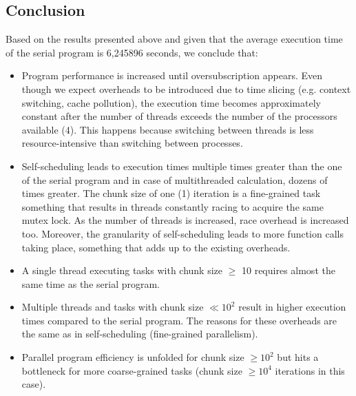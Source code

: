 \documentclass{article}
\begin{document}
\pagebreak

\subsection{Conclusion}
Based on the results presented above and given that the average execution time of the serial
program is 6,245896 seconds, we conclude that:

\begin{itemize}
 \item Program performance is increased until oversubscription appears. Even though we expect
       overheads to be introduced due to time slicing (e.g. context switching, cache pollution),
       the execution time becomes approximately constant after the number of threads exceeds
       the number of the processors available (4). This happens because switching between
       threads is less resource-intensive than switching between processes.
 \item Self-scheduling leads to execution times multiple times greater than the one of the
       serial program and in case of multithreaded calculation, dozens of times greater.
       The chunk size of one (1) iteration is a fine-grained task something that results
       in threads constantly racing to acquire the same mutex lock. As the number of threads
       is increased, race overhead is increased too. Moreover, the granularity of self-scheduling
       leads to more function calls taking place, something that adds up to the existing overheads.
 \item A single thread executing tasks with chunk size $\geq$ 10 requires almost the same time
       as the serial program.
 \item Multiple threads and tasks with chunk size $\ll 10^2$ result in higher execution times
       compared to the serial program. The reasons for these overheads are the same as in
       self-scheduling (fine-grained parallelism).
 \item Parallel program efficiency is unfolded for chunk size $\geq 10^2$ but hits a bottleneck
       for more coarse-grained tasks (chunk size $\geq 10^4$ iterations in this case).
\end{itemize}


\end{document}

